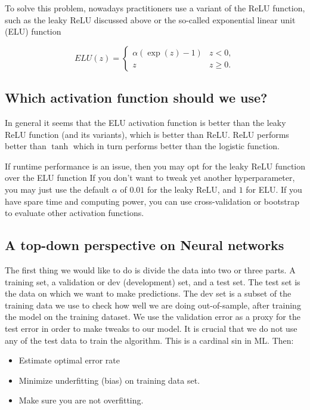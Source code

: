 \documentclass[%
oneside,                 %
final,                   %
10pt]{article}
\begin{document}
To solve this problem, nowadays practitioners use a  variant of the ReLU
function, such as the leaky ReLU discussed above or the so-called
exponential linear unit (ELU) function


\[
ELU(z) = \left\{\begin{array}{cc} \alpha\left( \exp{(z)}-1\right) & z < 0,\\  z & z \ge 0.\end{array}\right. 
\]

\subsection{Which activation function should we use?}

In general it seems that the ELU activation function is better than
the leaky ReLU function (and its variants), which is better than
ReLU. ReLU performs better than $\tanh$ which in turn performs better
than the logistic function. 

If runtime
performance is an issue, then you may opt for the  leaky ReLU function  over the 
ELU function If you don’t
want to tweak yet another hyperparameter, you may just use the default
$\alpha$ of $0.01$ for the leaky ReLU, and $1$ for ELU. If you have
spare time and computing power, you can use cross-validation or
bootstrap to evaluate other activation functions.


\subsection{A top-down perspective on Neural networks}


The first thing we would like to do is divide the data into two or three
parts. A training set, a validation or dev (development) set, and a
test set. The test set is the data on which we want to make
predictions. The dev set is a subset of the training data we use to
check how well we are doing out-of-sample, after training the model on
the training dataset. We use the validation error as a proxy for the
test error in order to make tweaks to our model. It is crucial that we
do not use any of the test data to train the algorithm. This is a
cardinal sin in ML. Then:


\begin{itemize}
\item Estimate optimal error rate

\item Minimize underfitting (bias) on training data set.

\item Make sure you are not overfitting.
\end{itemize}
\end{document}
